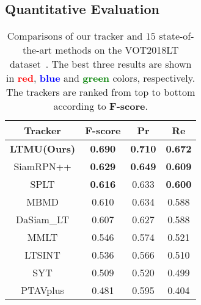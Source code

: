 \documentclass[10pt,twocolumn,letterpaper]{article}
\begin{document}
\vspace{-2mm}
\subsection{Quantitative Evaluation}
\vspace{-4mm}
\begin{table}[htbp]
\caption{Comparisons of our tracker and $15$ state-of-the-art methods on the VOT2018LT
dataset~\cite{VOT2018report}. The best three results are shown in \textcolor{red}{\textbf{red}},
\textcolor{blue}{\textbf{blue}} and \textcolor{green}{\textbf{green}} colors, respectively.
The trackers are ranked from top to bottom according to \textbf{F-score}.}
\label{tab-vot18lt}
\vspace{-2mm}
\small
\begin{center}
\begin{tabular}{cccc}
\hline
\textbf{Tracker} & \textbf{F-score}                      & \textbf{Pr}                           & \textbf{Re}                           \\ \hline
\textbf{LTMU(Ours)}             & {\color[HTML]{FE0000} \textbf{0.690}} & {\color[HTML]{FE0000} \textbf{0.710}} & {\color[HTML]{FE0000} \textbf{0.672}} \\
SiamRPN++        & {\color[HTML]{3166FF} \textbf{0.629}} & {\color[HTML]{3166FF} \textbf{0.649}} & {\color[HTML]{3166FF} \textbf{0.609}} \\
SPLT             & {\color[HTML]{32CB00} \textbf{0.616}} & 0.633                                 & {\color[HTML]{32CB00} \textbf{0.600}} \\
MBMD              & 0.610                                 & 0.634                                 & 0.588                            \\
DaSiam\_LT       & 0.607                                 & {\color[HTML]{000000} 0.627}          & 0.588       \\
MMLT                & 0.546                                 & 0.574                                 & 0.521                            \\
LTSINT              & 0.536                                 & 0.566                                 & 0.510                            \\
SYT                   & 0.509                                 & 0.520                                 & 0.499                             \\
PTAVplus           & 0.481                                 & 0.595                                 & 0.404                            \\

\end{tabular}
\end{center}
\end{table}
\end{document}
